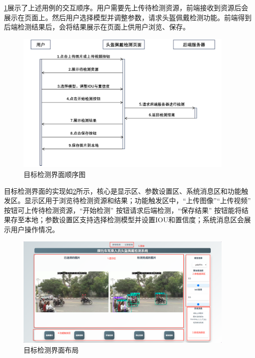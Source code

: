 \ref{fig:seq1}展示了上述用例的交互顺序。用户需要先上传待检测资源，前端接收到资源后会展示在页面上。然后用户选择模型并调整参数，请求头盔佩戴检测功能。前端得到后端检测结果后，会将结果展示在页面上供用户浏览、保存。
\begin{figure}[!htb]
    \centering
    \includegraphics[width=0.95\textwidth]{figs/chap05/seq1.png}
    \caption{目标检测界面顺序图}
    \label{fig:seq1}
\end{figure}

目标检测界面的实现如\ref{fig:detAll}所示，核心是显示区、参数设置区、系统消息区和功能触发区。显示区用于浏览待检测资源和结果；功能触发区中，“上传图像”“上传视频” 按钮可上传待检测资源，“开始检测” 按钮请求后端检测，“保存结果” 按钮能将结果存至本地；参数设置区支持选择检测模型并设置IOU和置信度；系统消息区会展示用户操作情况。

\begin{figure}[H]
    \centering
    \includegraphics[width=0.95\textwidth]{figs/chap05/detAll.png}
    \caption{目标检测界面布局}
    \label{fig:detAll}
\end{figure}


